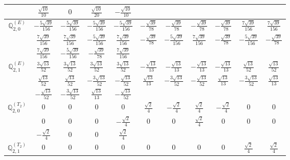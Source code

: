 \documentclass[fleqn,10pt,landscape]{article}
\begin{document}
\begin{itemize}
{\begin{center}
\begin{longtable}{ccccccccccc}
& $ \frac{\sqrt{10}}{10} $ & $ 0 $ & $ \frac{\sqrt{10}}{20} $ & $ - \frac{\sqrt{10}}{10} $ & $  $ & $  $ & $  $ & $  $ & $  $ & $  $ \\ \hline
$\mathbb{Q}_{2,0}^{(E)}$ & $ - \frac{5 \sqrt{39}}{156} $ & $ - \frac{5 \sqrt{39}}{156} $ & $ - \frac{5 \sqrt{39}}{156} $ & $ - \frac{5 \sqrt{39}}{156} $ & $ - \frac{\sqrt{39}}{78} $ & $ - \frac{\sqrt{39}}{78} $ & $ - \frac{\sqrt{39}}{78} $ & $ - \frac{\sqrt{39}}{78} $ & $ \frac{7 \sqrt{39}}{156} $ & $ \frac{7 \sqrt{39}}{156} $ \\
& $ \frac{7 \sqrt{39}}{156} $ & $ \frac{7 \sqrt{39}}{156} $ & $ - \frac{5 \sqrt{39}}{156} $ & $ \frac{7 \sqrt{39}}{156} $ & $ - \frac{\sqrt{39}}{78} $ & $ - \frac{5 \sqrt{39}}{156} $ & $ \frac{7 \sqrt{39}}{156} $ & $ - \frac{\sqrt{39}}{78} $ & $ - \frac{5 \sqrt{39}}{156} $ & $ - \frac{\sqrt{39}}{78} $ \\
& $ \frac{7 \sqrt{39}}{156} $ & $ - \frac{5 \sqrt{39}}{156} $ & $ - \frac{\sqrt{39}}{78} $ & $ \frac{7 \sqrt{39}}{156} $ & $  $ & $  $ & $  $ & $  $ & $  $ & $  $ \\ \hline
$\mathbb{Q}_{2,1}^{(E)}$ & $ \frac{3 \sqrt{13}}{52} $ & $ \frac{3 \sqrt{13}}{52} $ & $ \frac{3 \sqrt{13}}{52} $ & $ \frac{3 \sqrt{13}}{52} $ & $ - \frac{\sqrt{13}}{13} $ & $ - \frac{\sqrt{13}}{13} $ & $ - \frac{\sqrt{13}}{13} $ & $ - \frac{\sqrt{13}}{13} $ & $ \frac{\sqrt{13}}{52} $ & $ \frac{\sqrt{13}}{52} $ \\
& $ \frac{\sqrt{13}}{52} $ & $ \frac{\sqrt{13}}{52} $ & $ - \frac{3 \sqrt{13}}{52} $ & $ - \frac{\sqrt{13}}{52} $ & $ \frac{\sqrt{13}}{13} $ & $ - \frac{3 \sqrt{13}}{52} $ & $ - \frac{\sqrt{13}}{52} $ & $ \frac{\sqrt{13}}{13} $ & $ - \frac{3 \sqrt{13}}{52} $ & $ \frac{\sqrt{13}}{13} $ \\
& $ - \frac{\sqrt{13}}{52} $ & $ - \frac{3 \sqrt{13}}{52} $ & $ \frac{\sqrt{13}}{13} $ & $ - \frac{\sqrt{13}}{52} $ & $  $ & $  $ & $  $ & $  $ & $  $ & $  $ \\ \hline
$\mathbb{Q}_{2,0}^{(T_{2})}$ & $ 0 $ & $ 0 $ & $ 0 $ & $ 0 $ & $ \frac{\sqrt{2}}{4} $ & $ - \frac{\sqrt{2}}{4} $ & $ \frac{\sqrt{2}}{4} $ & $ - \frac{\sqrt{2}}{4} $ & $ 0 $ & $ 0 $ \\
& $ 0 $ & $ 0 $ & $ 0 $ & $ - \frac{\sqrt{2}}{4} $ & $ 0 $ & $ 0 $ & $ \frac{\sqrt{2}}{4} $ & $ 0 $ & $ 0 $ & $ 0 $ \\
& $ - \frac{\sqrt{2}}{4} $ & $ 0 $ & $ 0 $ & $ \frac{\sqrt{2}}{4} $ & $  $ & $  $ & $  $ & $  $ & $  $ & $  $ \\ \hline
$\mathbb{Q}_{2,1}^{(T_{2})}$ & $ 0 $ & $ 0 $ & $ 0 $ & $ 0 $ & $ 0 $ & $ 0 $ & $ 0 $ & $ 0 $ & $ \frac{\sqrt{2}}{4} $ & $ \frac{\sqrt{2}}{4} $ \\

\end{longtable}
\end{center}}
\end{itemize}
\end{document}
